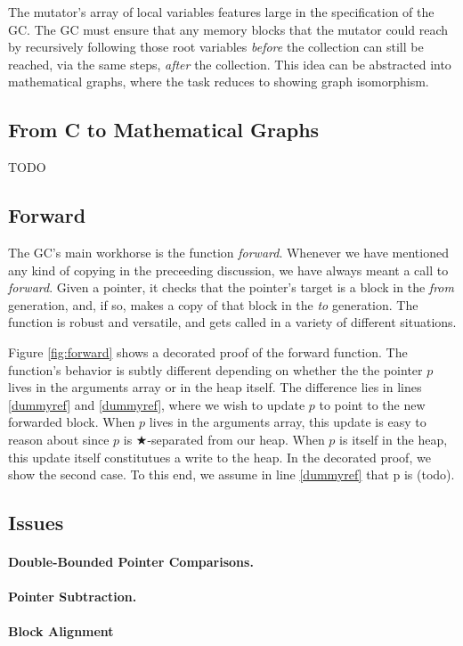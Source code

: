 The mutator's array of local variables features large in the specification 
of the GC. The GC must ensure that any memory blocks that the mutator 
could reach by recursively following those root variables \emph{before} the 
collection can still be reached, via the same steps, \emph{after} the collection.
This idea can be abstracted into mathematical graphs,
where the task reduces to showing graph isomorphism.

\subsection{From C to Mathematical Graphs}
\label{sec:movetomathgraph}
TODO

\subsection{Forward}
\label{sec:gcforward}
The GC's main workhorse is the function \emph{forward}.
Whenever we have mentioned any kind of copying in the preceeding 
discussion, we have always meant a call to \emph{forward}. 
Given a pointer, it checks that the pointer's target is a block
in the \emph{from} generation, and, if so, 
makes a copy of that block in the \emph{to} generation. 
{\color{magenta}The function 
is robust and versatile, and gets called in a variety of different 
situations.}

Figure \ref{fig:forward} shows a decorated proof of the forward function.
The function's behavior is subtly different depending on 
whether the the pointer $p$ lives in the arguments array or in the 
heap itself. The difference lies in lines \ref{dummyref} and \ref{dummyref}, where 
we wish to update $p$ to point to the new forwarded block. 
When $p$ lives in the arguments array, this update is easy to 
reason about since $p$ is $\bigstar$-separated from our heap. 
When $p$ is itself in the heap, this update itself constitutues a
write to the heap. In the decorated proof, we show the second 
case. To this end, we assume in line \ref{dummyref} that p is (todo). 



\subsection{Issues}
\label{sec:gccsemantics}
\paragraph{Double-Bounded Pointer Comparisons.}
\paragraph{Pointer Subtraction.}
\paragraph{Block Alignment}

%
